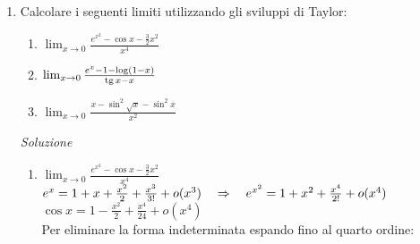 \documentclass{article}
\begin{document}
\begin{enumerate}[label=\textbf{Esercizio 
    8.\arabic*.},itemindent=*]
\begin{enumerate}
        Da cui
        \[\log x=\log 2+\left( \frac{x}{2}-1 \right)+\frac{1}{2}\left( \frac{x}{2}-1 \right)^2+\frac{1}{3}\left( \frac{x}{2}-1 \right)^3+o\left(\left( \frac{x}{2}-1 \right)^3\right)\]
        \item Poniamo $t=\tg x$ e $y=\arctg(x)$. In un intorno di $0$, sia $\tg x$ che $\arctg x$ tendono a 0, quindi anche $t$ e $y$. Utilizzando gli sviluppi fondamentali
        \[\sen t+\log(1+ y)=\left[ t-\frac{t^3}{6} +o(t^3)\right]+\left[ y-\frac{y^2}{2} +\frac{y^3}{3}+o(y^3)\right]\]
        Adesso sviluppiamo anche $t$ e $y$:
        \[t=\tg x= x+\frac{x^3}{3}+o(x^3)~~~~~~y=\arctg x=x-\frac{x^3}{3}+o(x^3)\]
        Di conseguenza 
        \[\begin{align*}
            &\sen (\tg x)+\log(1+\arctg x)=\\&=\left[ \left( x+\frac{x^3}{3}+o(x^3) \right)-\frac{\left( x+\frac{x^3}{3}+o(x^3) \right)^3}{6} +o\left(\left( x+\frac{x^3}{3}+o(x^3) \right)^3\right)\right]+\\&+\left[ \left( x-\frac{x^3}{3}+o(x^3) \right)-\frac{\left( x-\frac{x^3}{3}+o(x^3) \right)^2}{2} +\frac{\left( x-\frac{x^3}{3}+o(x^3) \right)^3}{3}+o\left(\left( x-\frac{x^3}{3}+o(x^3) \right)^3\right)\right]=\\&=2x+\frac{x^3}{3}-\frac{1}{2}x^2+o(x^3)
        \end{align*}\]
    \end{enumerate}
\item Calcolare i seguenti limiti utilizzando gli sviluppi di Taylor:
    \begin{enumerate}
        \item $\lim_{x\to 0}\frac{e^{x^2}-\cos x-\frac{3}{2}x^2}{x^4}$
        \item $\lim_{x\to 0}\frac{e^x-1-\log(1-x)}{\operatorname{tg} x-x}$
        \item $\lim_{x\to 0}\frac{x-\sin^2 \sqrt{x}-\sin^2x}{x^2}$
    \end{enumerate}
    \item[\textit{\large Soluzione~}]~
    \begin{enumerate}
        \item $\lim_{x\to 0}\frac{e^{x^2}-\cos x-\frac{3}{2}x^2}{x^4}$
        \\ $e^x=1+x+\frac{x^2}{2}+\frac{x^3}{3!}+o(x^3)~~~\Rightarrow~~~e^{x^2}=1+x^2+\frac{x^4}{2!}+o(x^4)$
        \\$\cos x=1-\frac{x^2}{2}+\frac{x^4}{24}+o(x^4)$
        \\ Per eliminare la forma indeterminata espando fino al quarto ordine:

\end{enumerate}
\end{enumerate}
\end{document}
